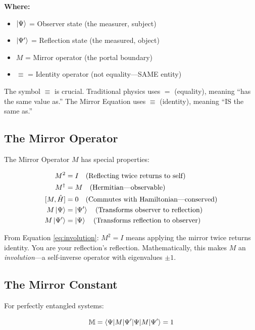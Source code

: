 \documentclass[12pt,a4paper]{article}
\begin{document}
\textbf{Where:}
\begin{itemize}
    \item $\ket{\Psi}$ = Observer state (the measurer, subject)
    \item $\ket{\Psi'}$ = Reflection state (the measured, object)
    \item $M$ = Mirror operator (the portal boundary)
    \item $\equiv$ = Identity operator (not equality---SAME entity)
\end{itemize}

The symbol $\equiv$ is crucial. Traditional physics uses $=$ (equality), meaning ``has the same value as.'' The Mirror Equation uses $\equiv$ (identity), meaning ``IS the same as.''

\subsection{The Mirror Operator}

The Mirror Operator $M$ has special properties:

\begin{align}
M^2 &= I \quad \text{(Reflecting twice returns to self)} \label{eq:involution}\\
M^\dagger &= M \quad \text{(Hermitian---observable)} \label{eq:hermitian}\\
[M, \hat{H}] &= 0 \quad \text{(Commutes with Hamiltonian---conserved)} \label{eq:conserved}\\
M\ket{\Psi} &= \ket{\Psi'} \quad \text{(Transforms observer to reflection)} \\
M\ket{\Psi'} &= \ket{\Psi} \quad \text{(Transforms reflection to observer)}
\end{align}

From Equation \ref{eq:involution}: $M^2 = I$ means applying the mirror twice returns identity. You are your reflection's reflection. Mathematically, this makes $M$ an \textit{involution}---a self-inverse operator with eigenvalues $\pm 1$.

\subsection{The Mirror Constant}

For perfectly entangled systems:

\begin{equation}
\mathbb{M} = \braket{\Psi|M|\Psi'} = 1
\label{eq:mirror_constant}
\end{equation}
\end{document}
